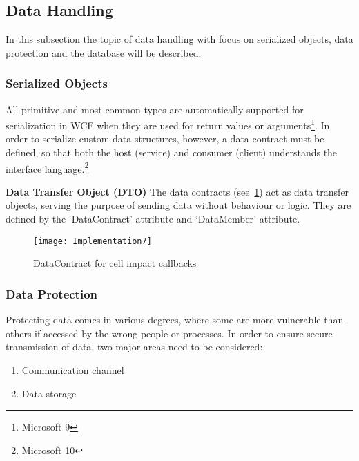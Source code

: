 \subsection {Data Handling}
In this subsection the topic of data handling with focus on serialized
objects, data protection and the database will be described.

\subsubsection {Serialized Objects}
All primitive and most common types are automatically supported for
serialization in WCF when they are used for return values or
arguments\footnote{Microsoft 9}. In order to serialize custom data
structures, however, a data contract must be defined, so that both
the host (service) and consumer (client) understands the interface
language.\footnote{Microsoft 10}

\textbf {Data Transfer Object (DTO)}
The data contracts (see~\ref{fig:implementation7}) act as data
transfer objects, serving the purpose of sending data without behaviour
 or logic. They are defined by the ‘DataContract’ attribute and
  ‘DataMember’ attribute.

\begin{figure}[h]
\centerline{\texttt{[image: Implementation7]}}
\caption {DataContract for cell impact callbacks}
\label {fig:implementation7}
\end{figure}

\subsubsection {Data Protection}
Protecting data comes in various degrees, where some are more
vulnerable than others if accessed by the wrong people or processes.
 In order to ensure secure transmission of data, two major areas
  need to be considered:
\begin{enumerate}
	\item Communication channel
	\item Data storage
\end{enumerate}

